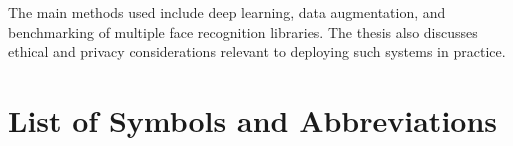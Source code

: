 \documentclass[]{tukethesis}
\begin{document}
The main methods used include deep learning, data augmentation, and benchmarking of multiple face recognition libraries. The thesis also discusses ethical and privacy considerations relevant to deploying such systems in practice.
\endpreface

\thispagestyle{empty}
\tableofcontents
\newpage

\thispagestyle{empty}
\listoffigures
\newpage

\thispagestyle{empty}
\listoftables
\newpage

\thispagestyle{empty}
\printglossary %
\newpage

\section*{List of Symbols and Abbreviations}
\end{document}
